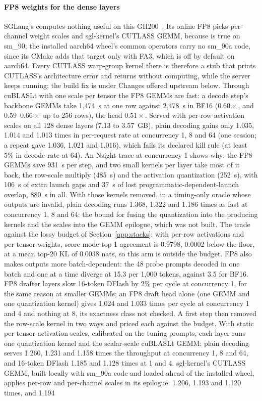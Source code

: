 \paragraph{FP8 weights for the dense layers} SGLang's  computes nothing useful on this GH200~. Its online FP8 picks per-channel weight scales and sgl-kernel's CUTLASS GEMM, because  is true on sm\_90; the installed aarch64 wheel's common operators carry no sm\_90a code, since its CMake adds that target only with FA3, which is off by default on aarch64. Every CUTLASS warp-group kernel there is therefore a stub that prints CUTLASS's architecture error and returns without computing, while the server keeps running; the build fix is under Changes offered upstream below. Through cuBLASLt with one scale per tensor the FP8 GEMMs are fast: a decode step's backbone GEMMs take 1,474~\textmu s at one row against 2,478~\textmu s in BF16 ($0.60\times$, and $0.59$--$0.66\times$ up to 256 rows), the head $0.51\times$. Served with per-row activation scales on all 128 dense layers (7.13 to 3.57~GB), plain decoding gains only 1.035, 1.014 and 1.013 times in per-request rate at concurrency 1, 8 and 64 (one session; a repeat gave 1.036, 1.021 and 1.016), which fails its declared kill rule (at least 5\% in decode rate at 64). An Nsight trace at concurrency 1 shows why: the FP8 GEMMs save 931~\textmu s per step, and two small kernels per layer take most of it back, the row-scale multiply (485~\textmu s) and the activation quantization (252~\textmu s), with 106~\textmu s of extra launch gaps and 37~\textmu s of lost programmatic-dependent-launch overlap, 880~\textmu s in all. With those kernels removed, in a timing-only oracle whose outputs are invalid, plain decoding runs 1.368, 1.322 and 1.186 times as fast at concurrency 1, 8 and 64: the bound for fusing the quantization into the producing kernels and the scales into the GEMM epilogue, which was not built. The trade against the lossy budget of Section~\ref{app:stacks}: with per-row activations and per-tensor weights, score-mode top-1 agreement is 0.9798, 0.0002 below the floor, at a mean top-20 KL of 0.0038 nats, so this arm is outside the budget. FP8 also makes outputs more batch-dependent: the 48 probe prompts decoded in one batch and one at a time diverge at 15.3 per 1,000 tokens, against 3.5 for BF16. FP8 drafter layers slow 16-token DFlash by 2\% per cycle at concurrency 1, for the same reason at smaller GEMMs; an FP8 draft head alone (one GEMM and one quantization kernel) gives 1.024 and 1.033 times per cycle at concurrency 1 and 4 and nothing at 8, its exactness class not checked. A first step then removed the row-scale kernel in two ways and priced each against the budget. With static per-tensor activation scales, calibrated on the tuning prompts, each layer runs one quantization kernel and the scalar-scale cuBLASLt GEMM: plain decoding serves 1.260, 1.231 and 1.158 times the throughput at concurrency 1, 8 and 64, and 16-token DFlash 1.185 and 1.128 times at 1 and 4. sgl-kernel's CUTLASS GEMM, built locally with sm\_90a code and loaded ahead of the installed wheel, applies per-row and per-channel scales in its epilogue: 1.206, 1.193 and 1.120 times, and 1.194 